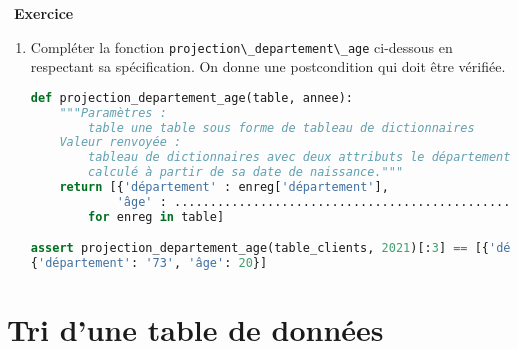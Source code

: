 \documentclass[
  11pt,
]{article}
\newcommand{\passthrough}[1]{#1}
\newcounter{exo}
\newenvironment{exercice}[1]
{\par \medskip   \addtocounter{exo}{1} \noindent  
\begin{bclogo}[arrondi =0.1,   noborder = true, logo=\bccrayon, marge=4]{~\textbf{Exercice} \textbf{\theexo} {\itshape #1} }  \par}
{
\end{bclogo}
 \par \bigskip }
\newcounter{def}
\begin{document}
\begin{exercice}{}
\begin{enumerate}
\begin{lstlisting}[language=Python]
assert selection_departement_projection_visites(table_clients, "69")[:10] == [43, 52, 127, 53, 41, 117, 31, 86, 107, 145]
\end{lstlisting}
\item
  Compléter la fonction
  \passthrough{\lstinline!projection\_departement\_age!} ci-dessous en
  respectant sa spécification. On donne une postcondition qui doit être
  vérifiée.

\begin{lstlisting}[language=Python]
def projection_departement_age(table, annee):
    """Paramètres : 
        table une table sous forme de tableau de dictionnaires
    Valeur renvoyée :
        tableau de dictionnaires avec deux attributs le département et l'âge du client
        calculé à partir de sa date de naissance."""
    return [{'département' : enreg['département'], 
            'âge' : ................................................} 
        for enreg in table]

assert projection_departement_age(table_clients, 2021)[:3] == [{'département': '79', 'âge': 61}, {'département': '10', 'âge': 27},
{'département': '73', 'âge': 20}]
\end{lstlisting}
\end{enumerate}

\end{exercice}

\hypertarget{tri-dune-table-de-donnuxe9es}{%
\section{Tri d'une table de
données}\label{tri-dune-table-de-donnuxe9es}}
\end{document}
